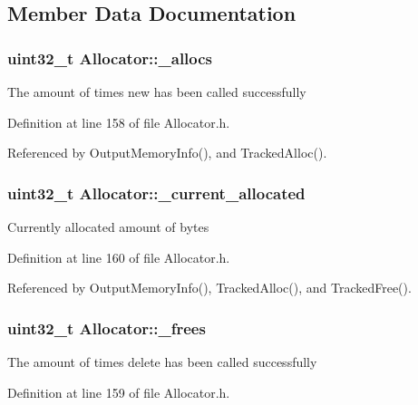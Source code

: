\subsection{Member Data Documentation}
\subsubsection[{\-\_\-allocs}]{\setlength{\rightskip}{0pt plus 5cm}uint32\-\_\-t Allocator\-::\-\_\-allocs\hspace{0.3cm}{\ttfamily [private]}}\label{class_allocator_a62a5f8bb48b4417a9c20fec53dfd7201}
The amount of times new has been called successfully 

Definition at line 158 of file Allocator.\-h.



Referenced by Output\-Memory\-Info(), and Tracked\-Alloc().

\subsubsection[{\-\_\-current\-\_\-allocated}]{\setlength{\rightskip}{0pt plus 5cm}uint32\-\_\-t Allocator\-::\-\_\-current\-\_\-allocated\hspace{0.3cm}{\ttfamily [private]}}\label{class_allocator_a3df5e505a4e72b64ea8c055e7f385bb3}
Currently allocated amount of bytes 

Definition at line 160 of file Allocator.\-h.



Referenced by Output\-Memory\-Info(), Tracked\-Alloc(), and Tracked\-Free().

\subsubsection[{\-\_\-frees}]{\setlength{\rightskip}{0pt plus 5cm}uint32\-\_\-t Allocator\-::\-\_\-frees\hspace{0.3cm}{\ttfamily [private]}}\label{class_allocator_aef8120c4c4eeec914b6fb7aa609eb533}
The amount of times delete has been called successfully 

Definition at line 159 of file Allocator.\-h.



